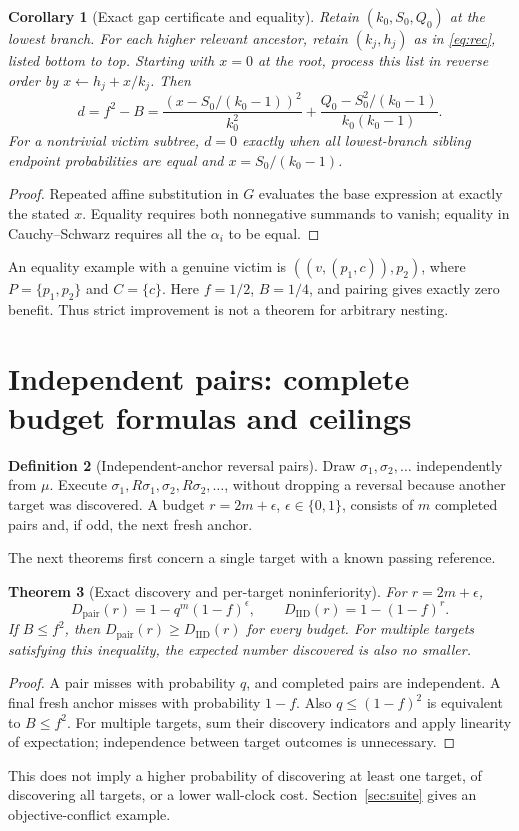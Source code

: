 \documentclass[11pt,a4paper]{article}
\newtheorem{theorem}{Theorem}[section]
\newtheorem{corollary}[theorem]{Corollary}
\theoremstyle{definition}\newtheorem{definition}[theorem]{Definition}
\theoremstyle{remark}\newtheorem{remark}[theorem]{Remark}
\newcommand{\IID}{\mathrm{IID}}
\newcommand{\PAIR}{\mathrm{pair}}
\theoremstyle{definition}\newtheorem{xexample}[xtheorem]{Example}\theoremstyle{plain}
\begin{document}
\begin{corollary}[Exact gap certificate and equality]\label{cor:cert}
Retain $(k_0,S_0,Q_0)$ at the lowest branch. For each higher relevant ancestor, retain $(k_j,h_j)$ as in \eqref{eq:rec}, listed bottom to top. Starting with $x=0$ at the root, process this list in reverse order by $x\leftarrow h_j+x/k_j$. Then
\begin{equation}\label{eq:certificate}
 d=f^2-B=\frac{(x-S_0/(k_0-1))^2}{k_0^2}
       +\frac{Q_0-S_0^2/(k_0-1)}{k_0(k_0-1)}.
\end{equation}
For a nontrivial victim subtree, $d=0$ exactly when all lowest-branch sibling endpoint probabilities are equal and $x=S_0/(k_0-1)$.
\end{corollary}
\begin{proof}
Repeated affine substitution in $G$ evaluates the base expression at exactly the stated $x$. Equality requires both nonnegative summands to vanish; equality in Cauchy--Schwarz requires all the $\alpha_i$ to be equal.
\end{proof}
An equality example with a genuine victim is $((v,(p_1,c)),p_2)$, where $P=\{p_1,p_2\}$ and $C=\{c\}$. Here $f=1/2$, $B=1/4$, and pairing gives exactly zero benefit. Thus strict improvement is not a theorem for arbitrary nesting.

\section{Independent pairs: complete budget formulas and ceilings}
\begin{definition}[Independent-anchor reversal pairs]
Draw $\sigma_1,\sigma_2,\ldots$ independently from $\mu$. Execute
$\sigma_1,R\sigma_1,\sigma_2,R\sigma_2,\ldots$, without dropping a reversal because another target was discovered. A budget $r=2m+\epsilon$, $\epsilon\in\{0,1\}$, consists of $m$ completed pairs and, if odd, the next fresh anchor.
\end{definition}
The next theorems first concern a single target with a known passing reference.

\begin{theorem}[Exact discovery and per-target noninferiority]\label{thm:budget}
For $r=2m+\epsilon$,
\begin{equation}\label{eq:budget}
 D_{\PAIR}(r)=1-q^m(1-f)^\epsilon,\qquad
 D_{\IID}(r)=1-(1-f)^r.
\end{equation}
If $B\le f^2$, then $D_{\PAIR}(r)\ge D_{\IID}(r)$ for every budget. For multiple targets satisfying this inequality, the expected number discovered is also no smaller.
\end{theorem}
\begin{proof}
A pair misses with probability $q$, and completed pairs are independent. A final fresh anchor misses with probability $1-f$. Also $q\le(1-f)^2$ is equivalent to $B\le f^2$. For multiple targets, sum their discovery indicators and apply linearity of expectation; independence between target outcomes is unnecessary.
\end{proof}
This does not imply a higher probability of discovering at least one target, of discovering all targets, or a lower wall-clock cost. Section~\ref{sec:suite} gives an objective-conflict example.
\end{document}
